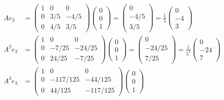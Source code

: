 \documentclass[12pt]{article}
\begin{document}
    \color{blue}
        \begin{align*}
            Ae_3 &= \begin{pmatrix}
                1 & 0 & 0\\ 
                0 & 3/5 & -4/5\\
                0 & 4/5 & 3/5
            \end{pmatrix}\begin{pmatrix}
                0\\0\\1
            \end{pmatrix} = \begin{pmatrix}
                0\\-4/5\\3/5
            \end{pmatrix} = \frac{1}{5} \begin{pmatrix}
                0\\-4\\3
            \end{pmatrix}\\ 
            A^2e_3 &= \begin{pmatrix}
                1 & 0 & 0\\ 
                0 & -7/25 & -24/25\\
                0 & 24/25 & -7/25
            \end{pmatrix}\begin{pmatrix}
                0\\0\\1
            \end{pmatrix} = \begin{pmatrix}
                0\\-24/25\\7/25
            \end{pmatrix} = \frac{1}{5^2} \begin{pmatrix}
                0\\-24\\7
            \end{pmatrix}\\ 
            A^3e_3 &= \begin{pmatrix}
                1 & 0 & 0\\ 
                0 & -117/125 & -44/125\\
                0 & 44/125 & -117/125
            \end{pmatrix}\begin{pmatrix}
                0\\0\\1

\end{pmatrix}
\end{align*}
\end{document}
